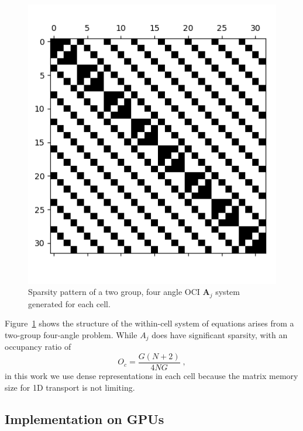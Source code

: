 \begin{figure}[htbp]
    \centering
    \includegraphics[width=.6\textwidth]{manuscript2/man2_figs/spyA.png}
    \caption{Sparsity pattern of a two group, four angle OCI $\bm{A}_j$ system generated for each cell.}
    \label{fig:spyA}
\end{figure}

Figure~\ref{fig:spyA} shows the structure of the within-cell system of equations arises from a two-group four-angle problem.
While $A_j$ does have significant sparsity,  with an occupancy ratio of
\begin{equation}
    O_c = \frac{G(N+2)}{4NG}
    \; ,
\end{equation}
in this work we use dense representations in each cell because the matrix memory size for 1D transport is not limiting.

\subsection{Implementation on GPUs}

